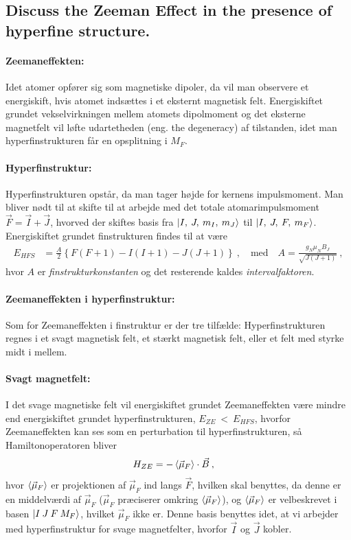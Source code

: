 \subsection{Discuss the Zeeman Effect in the presence of hyperfine structure.}


\paragraph{Zeemaneffekten:} Idet atomer opfører sig som magnetiske dipoler, da vil man observere et energiskift, hvis atomet indsættes i et eksternt magnetisk felt. Energiskiftet grundet vekselvirkningen mellem atomets dipolmoment og det eksterne magnetfelt vil løfte udartetheden (eng. the degeneracy) af tilstanden, idet man hyperfinstrukturen får en opsplitning i $M_F$.


\paragraph{Hyperfinstruktur:} Hyperfinstrukturen opstår, da man tager højde for kernens impulsmoment. Man bliver nødt til at skifte til at arbejde med det totale atomarimpulsmoment $\Vec{F} = \Vec{I} + \Vec{J}$, hvorved der skiftes basis fra $\ket{I,\: J,\: m_I,\: m_J}$ til $\ket{I,\: J,\: F,\: m_F}$. Energiskiftet grundet finstrukturen findes til at være
\begin{align}
    E_{HFS} &= \frac{A}{2}\left\{F(F+1) - I(I+1) - J(J+1)\right\} \: , \quad \text{med} \quad A = \frac{g_N \mu_N B_J}{\sqrt{J(J+1)}} \: ,
\end{align}
hvor $A$ er \emph{finstrukturkonstanten} og det resterende kaldes \emph{intervalfaktoren}.


\paragraph{Zeemaneffekten i hyperfinstruktur:} Som for Zeemaneffekten i finstruktur er der tre tilfælde: Hyperfinstrukturen regnes i et svagt magnetisk felt, et stærkt magnetisk felt, eller et felt med styrke midt i mellem.

\paragraph{Svagt magnetfelt:} I det svage magnetiske felt vil energiskiftet grundet Zeemaneffekten være mindre end energiskiftet grundet hyperfinstrukturen, $E_{ZE}~<~E_{HFS}$, hvorfor Zeemaneffekten kan ses som en perturbation til hyperfinstrukturen, så Hamiltonoperatoren bliver
\begin{align} \label{eq:Q17_StartudtrykForHamiltonForZeemaneffektenSvagtB}
    H_{ZE} &= - \Braket{\Vec{\mu}_F} \cdot \Vec{B} \: ,
\end{align}
hvor $\Braket{\Vec{\mu}_F}$ er projektionen af $\Vec{\mu}_F$ ind langs $\Vec{F}$, hvilken skal benyttes, da denne er en middelværdi af $\Vec{\mu}_F$ ($\Vec{\mu}_F$ præciserer omkring $\Braket{\Vec{\mu}_F}$), og $\Braket{\Vec{\mu}_F}$ er velbeskrevet i basen $\ket{I \: J \: F \: M_F}$, hvilket $\Vec{\mu}_F$ ikke er. Denne basis benyttes idet, at vi arbejder med hyperfinstruktur for svage magnetfelter, hvorfor $\Vec{I}$ og $\Vec{J}$ kobler.

